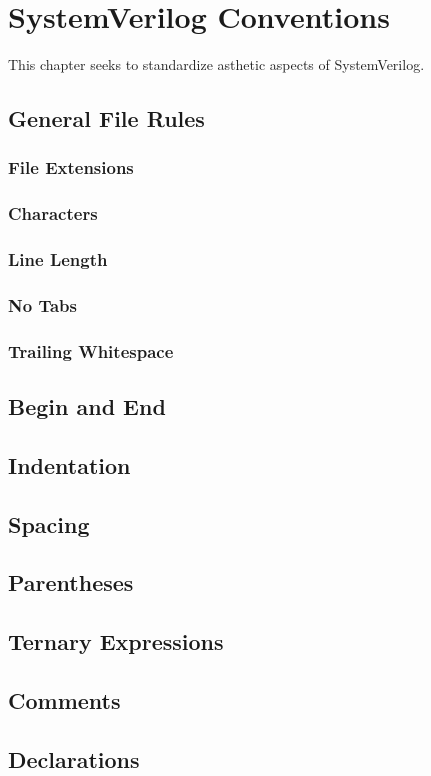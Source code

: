 \chapter{SystemVerilog Conventions}
\label{systemverilog_conventions}

  This chapter seeks to standardize asthetic aspects of SystemVerilog.

  \section{General File Rules}

    \subsection{File Extensions}
    \subsection{Characters}
    \subsection{Line Length}
    \subsection{No Tabs}
    \subsection{Trailing Whitespace}

  \section{Begin and End}

  \section{Indentation}

  \section{Spacing}

  \section{Parentheses}

  \section{Ternary Expressions}

  \section{Comments}

  \section{Declarations}
